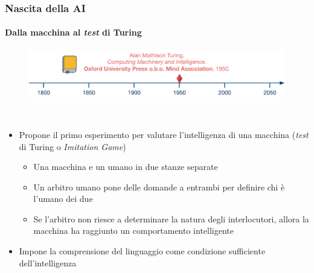 \begin{frame}[t,fragile] \frametitle{Nascita della AI}
    {\scriptsize
        \framesubtitle{Dalla macchina al \textit{test} di Turing}
        \vspace*{-15pt}
	    \begin{minipage}[t]{\textwidth}
		    \begin{figure}[ht]
			    \centering
			    \includegraphics[width=\textwidth]{img/AI-timeline-1950-alt.png}
		    \end{figure}
	    \end{minipage}
	    \\\vspace*{3pt}
	    \begin{minipage}[t]{\textwidth}
		    \begin{minipage}[t]{0.6\textwidth}
			    \begin{itemize}[leftmargin=10pt,align=right]
				    \onslide<2->\item[\alert{\faHandORight}] Propone il primo esperimento per valutare l'intelligenza di una macchina (\alert{\textit{test} di Turing} o \alert{\textit{Imitation Game}})
				    \onslide<3->\begin{itemize}[leftmargin=10pt,align=right]
						\item[\alert{\faHandORight}] Una macchina e un umano in due stanze separate
						\item[\alert{\faHandORight}] Un arbitro umano pone delle domande a entrambi per definire chi è l'umano dei due
						\item[\alert{\faHandORight}] Se l'arbitro non riesce a determinare la natura degli interlocutori, allora la macchina ha raggiunto un comportamento intelligente
				    \end{itemize}
				    \item[\alert{\faHandORight}] Impone la comprensione del linguaggio come \alert{condizione sufficiente} dell'intelligenza
			    \end{itemize}
		    \end{minipage}
		    \begin{minipage}[t]{0.4\textwidth}
			    \centering
			    \begin{figure}[ht]

\end{figure}
\end{minipage}
\end{minipage}}
\end{frame}
